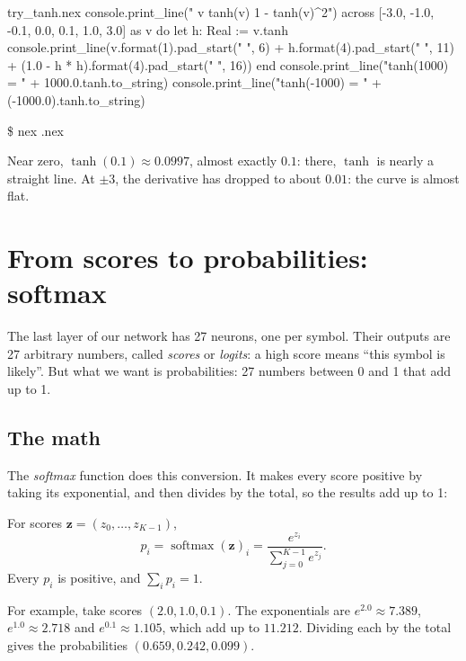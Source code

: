 \documentclass[11pt,a4paper,oneside,openany]{book}
\newcommand{\tryoutput}[1]{%
  \begin{tcolorbox}[outbox]
  {\ttfamily\footnotesize\color{outfg}\$ nex \detokenize{#1}.nex}\par\vspace{2pt}
  
  \end{tcolorbox}}
\newcommand{\vect}[1]{\mathbf{#1}}
\begin{document}
\begin{tryit}{try_tanh.nex}
console.print_line("     v    tanh(v)   1 - tanh(v)^2")
across [-3.0, -1.0, -0.1, 0.0, 0.1, 1.0, 3.0] as v do
  let h: Real := v.tanh
  console.print_line(v.format(1).pad_start(" ", 6) + h.format(4).pad_start(" ", 11)
    + (1.0 - h * h).format(4).pad_start(" ", 16))
end
console.print_line("tanh(1000)  = " + 1000.0.tanh.to_string)
console.print_line("tanh(-1000) = " + (-1000.0).tanh.to_string)
\end{tryit}
\tryoutput{try_tanh}

Near zero, $\tanh(0.1) \approx 0.0997$, almost exactly $0.1$: there,
$\tanh$ is nearly a straight line. At $\pm 3$, the derivative has dropped
to about $0.01$: the curve is almost flat.

\chapter{From scores to probabilities: softmax}

The last layer of our network has 27 neurons, one per symbol. Their
outputs are 27 arbitrary numbers, called \emph{scores} or \emph{logits}:
a high score means ``this symbol is likely''. But what we want is
probabilities: 27 numbers between 0 and 1 that add up to 1.

\section{The math}

The \emph{softmax} function does this conversion. It makes every score
positive by taking its exponential, and then divides by the total, so the
results add up to 1:

\begin{mathbox}[Softmax]
For scores $\vect{z} = (z_0, \dots, z_{K-1})$,
\[
  p_i = \operatorname{softmax}(\vect{z})_i = \frac{e^{z_i}}{\sum_{j=0}^{K-1} e^{z_j}} .
\]
Every $p_i$ is positive, and $\sum_i p_i = 1$.
\end{mathbox}

For example, take scores $(2.0, 1.0, 0.1)$. The exponentials are
$e^{2.0} \approx 7.389$, $e^{1.0} \approx 2.718$ and
$e^{0.1} \approx 1.105$, which add up to $11.212$. Dividing each by the
total gives the probabilities $(0.659, 0.242, 0.099)$.
\end{document}
